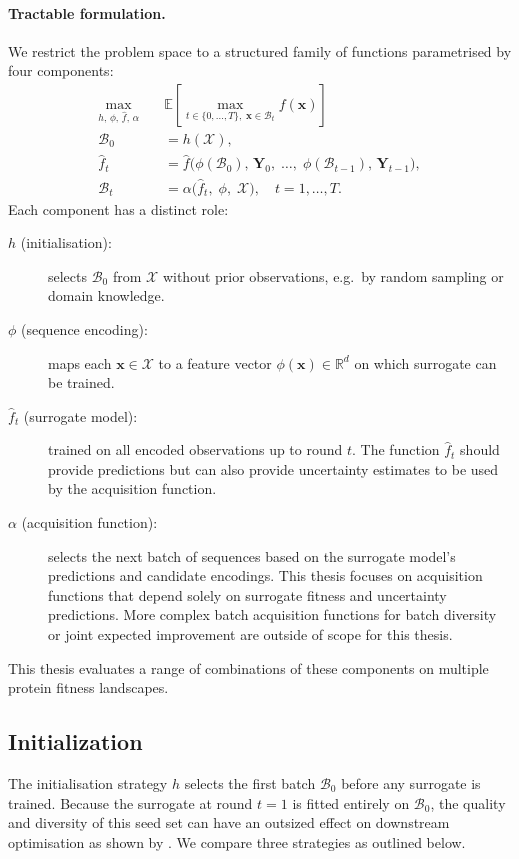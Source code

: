 \paragraph{Tractable formulation.}
We restrict the problem space to a structured family of functions parametrised by four components:
\begin{equation}
\begin{aligned}
  \max_{h,\,\phi,\,\hat{f},\,\alpha} \quad & \mathbb{E}\!\left[\max_{t \in \{0,\ldots,T\},\;\mathbf{x}\in\mathcal{B}_t} f(\mathbf{x})\right] \\[4pt]
  \mathcal{B}_0 &= h(\mathcal{X}), \\
  \hat{f}_t &= \hat{f}\bigl(\phi(\mathcal{B}_0),\,\mathbf{Y}_0,\;\ldots,\;\phi(\mathcal{B}_{t-1}),\,\mathbf{Y}_{t-1}\bigr), \\
  \mathcal{B}_t &= \alpha\!\bigl(\hat{f}_t,\;\phi,\;\mathcal{X}\bigr), \quad t = 1,\ldots,T.
\end{aligned}
\label{equation:maximizationdefinition}
\end{equation}
Each component has a distinct role:
\begin{description}
  \item[$h$ (initialisation):] selects $\mathcal{B}_0$ from $\mathcal{X}$ without prior observations, e.g.\ by random sampling or domain knowledge.
  \item[$\phi$ (sequence encoding):] maps each $\mathbf{x} \in \mathcal{X}$ to a feature vector $\phi(\mathbf{x}) \in \mathbb{R}^d$ on which surrogate can be trained.
  \item[$\hat{f}_t$ (surrogate model):] trained on all encoded observations up to round $t$. The function $\hat{f}_t$ should provide predictions but can also provide uncertainty estimates to be used by the acquisition function.
  \item[$\alpha$ (acquisition function):] selects the next batch of sequences based on the surrogate model's predictions and candidate encodings. This thesis focuses on acquisition functions that depend solely on surrogate fitness and uncertainty predictions. More complex batch acquisition functions for batch diversity or joint expected improvement are outside of scope for this thesis.
\end{description}
This thesis evaluates a range of combinations of these components on multiple protein fitness landscapes.

\subsection{Initialization}
The initialisation strategy $h$ selects the first batch $\mathcal{B}_0$ before any surrogate is trained.
Because the surrogate at round $t = 1$ is fitted entirely on $\mathcal{B}_0$, the quality and diversity of this seed set can have an outsized effect on downstream optimisation as shown by .
We compare three strategies as outlined below.

